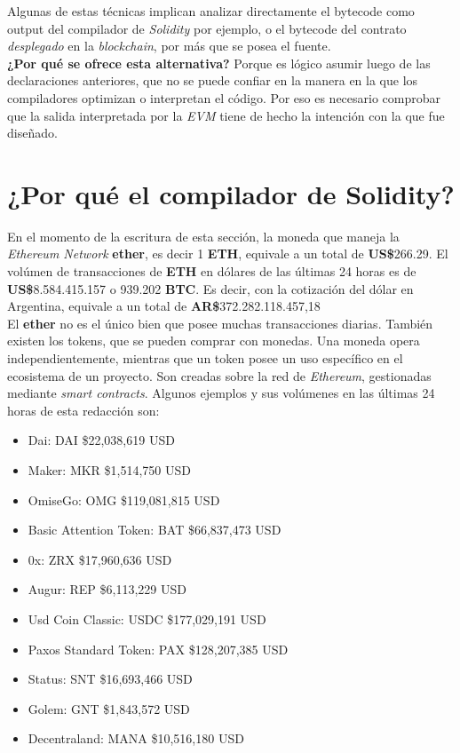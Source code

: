 Algunas de estas técnicas implican analizar directamente el bytecode como output del compilador de \textit{Solidity} por ejemplo, o el bytecode del contrato \textit{desplegado} en la \textit{blockchain}, por más que se posea el fuente.\\

\textbf{¿Por qué se ofrece esta alternativa?} Porque es lógico asumir luego de las declaraciones anteriores, que no se puede confiar en la manera en la que los compiladores optimizan o interpretan el código. Por eso es necesario comprobar que la salida interpretada por la \textit{EVM} tiene de hecho la intención con la que fue diseñado.

\section{¿Por qué el compilador de Solidity?}
\label{sect:marco:porquesolidity}

En el momento de la escritura de esta sección, la moneda que maneja la \textit{Ethereum Network} \textbf{ether}, es decir 1 \textbf{ETH}, equivale a un total de \textbf{US\$}266.29. El volúmen de transacciones de \textbf{ETH} en dólares de las últimas 24 horas es de \textbf{US\$}8.584.415.157 o 939.202 \textbf{BTC}. Es decir, con la cotización del dólar en Argentina, equivale a un total de \textbf{AR\$}372.282.118.457,18\cite{coinmarketcap}\\

El \textbf{ether} no es el único bien que posee muchas transacciones diarias. También existen los tokens, que se pueden comprar con monedas. Una moneda opera independientemente, mientras que un token posee un uso específico en el ecosistema de un proyecto. Son creadas sobre la red de \textit{Ethereum}, gestionadas mediante \textit{smart contracts}. Algunos ejemplos y sus volúmenes en las últimas 24 horas de esta redacción son:

\begin{itemize}
    \item Dai: DAI \$22,038,619 USD 
    \item Maker: MKR \$1,514,750 USD 
    \item OmiseGo: OMG \$119,081,815 USD 
    \item Basic Attention Token: BAT \$66,837,473 USD
    \item 0x: ZRX \$17,960,636 USD 
    \item Augur: REP \$6,113,229 USD
    \item Usd Coin Classic: USDC \$177,029,191 USD
    \item Paxos Standard Token: PAX \$128,207,385 USD
    \item Status: SNT \$16,693,466 USD
    \item Golem: GNT \$1,843,572 USD 
    \item Decentraland: MANA \$10,516,180 USD
\end{itemize}


